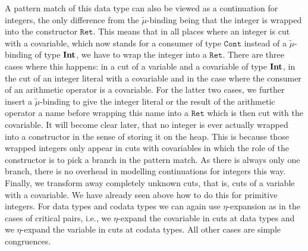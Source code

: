 \noindent A pattern match of this data type can also be viewed as a continuation for integers, the only difference from the $\tilde\mu$-binding being that the integer is wrapped into the constructor $\mathtt{Ret}$.
This means that in all places where an integer is cut with a covariable, which now stands for a consumer of type $\mathtt{Cont}$ instead of a $\tilde\mu$-binding of type $\mathbf{Int}$, we have to wrap the integer into a $\mathtt{Ret}$.
There are three cases where this happens: in a cut of a variable and a covariable of type $\mathbf{Int}$, in the cut of an integer literal with a covariable and in the case where the consumer of an arithmetic operator is a covariable.
For the latter two cases, we further insert a $\tilde\mu$-binding to give the integer literal or the result of the arithmetic operator a name before wrapping this name into a $\mathtt{Ret}$ which is then cut with the covariable.
It will become clear later, that no integer is ever actually wrapped into a constructor in the sense of storing it on the heap.
This is because those wrapped integers only appear in cuts with covariables in which the role of the constructor is to pick a branch in the pattern match.
As there is always only one branch, there is no overhead in modelling continuations for integers this way.
Finally, we transform away completely unknown cuts, that is, cuts of a variable with a covariable.
We have already seen above how to do this for primitive integers.
For data types and codata types we can again use $\eta$-expansion as in the cases of critical pairs, i.e., we $\eta$-expand the covariable in cuts at data types and we $\eta$-expand the variable in cuts at codata types.
All other cases are simple congruences.

